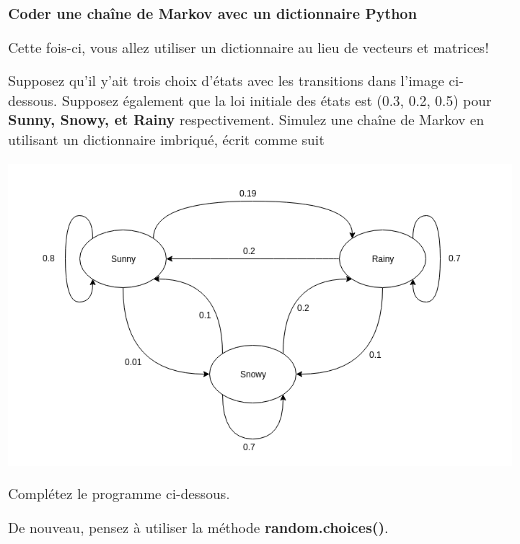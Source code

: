 \begin{Exercice}[20 minutes]\textbf{Coder une chaîne de Markov avec un dictionnaire Python}

Cette fois-ci, vous allez utiliser un dictionnaire au lieu de vecteurs et matrices!

Supposez qu'il y'ait trois choix d'états avec les transitions dans l'image ci-dessous. Supposez également que la loi initiale des états est (0.3, 0.2, 0.5) pour \textbf{Sunny, Snowy, et Rainy} respectivement. Simulez une chaîne de Markov en utilisant un dictionnaire imbriqué, écrit comme suit

\begin{center}
        \includegraphics[width=\linewidth]{Etats_markov.png}
\end{center}
    
Complétez le programme ci-dessous.


\begin{conseil}
    De nouveau, pensez à utiliser la méthode \textbf{random.choices()}.
\end{conseil}
\begin{solution}
    
\end{solution}
\end{Exercice}

\newpage
